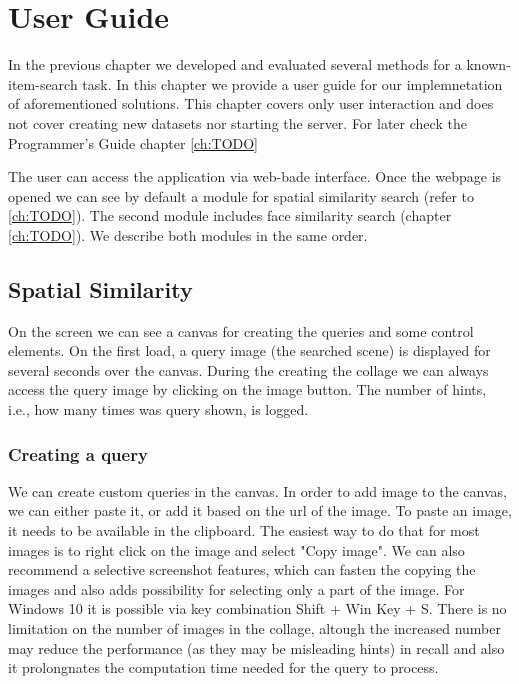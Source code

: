 \chapter{User Guide}
\label{ch:user_guide}


In the previous chapter we developed and evaluated several methods for a known-item-search task. In this chapter we provide a user guide for our implemnetation of aforementioned solutions. This chapter covers only user interaction and does not cover creating new datasets nor starting the server. For later check the Programmer's Guide chapter \ref{ch:TODO}

The user can access the application via web-bade interface. Once the webpage is opened we can see by default a module for spatial similarity search (refer to \ref{ch:TODO}). The second module includes face similarity search (chapter \ref{ch:TODO}). We describe both modules in the same order.

\section{Spatial Similarity}

On the screen we can see a canvas for creating the queries and some control elements. On the first load, a query image (the searched scene) is displayed for several seconds over the canvas. During the creating the collage we can always access the query image by clicking on the image button. The number of hints, i.e., how many times was query shown, is logged. 

\subsection*{Creating a query}

We can create custom queries in the canvas. In order to add image to the canvas, we can either paste it, or add it based on the url of the image. To paste an image, it needs to be available in the clipboard. The easiest way to do that for most images is to right click on the image and select "Copy image". We can also recommend a selective screenshot features, which can fasten the copying the images and also adds possibility for selecting only a part of the image. For Windows 10 it is possible via key combination Shift + Win Key + S. There is no limitation on the number of images in the collage, altough the increased number may reduce the performance (as they may be misleading hints) in recall and also it prolongnates the computation time needed for the query to process.

